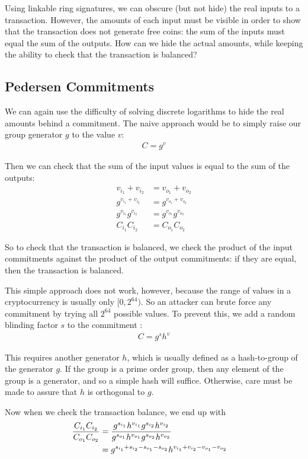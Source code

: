 \documentclass{article}
\begin{document}
Using linkable ring signatures, we can obscure (but not hide) the real inputs to a transaction.  However, the amounts of each input must be visible in order to show that the transaction does not generate free coins: the sum of the inputs must equal the sum of the outputs.  How can we hide the actual amounts, while keeping the ability to check that the transaction is balanced?


\subsection{Pedersen Commitments}

We can again use the difficulty of solving discrete logarithms to hide the real amounts behind a commitment.  The naive approach would be to simply raise our group generator $g$ to the value $v$:
\begin{align}
  C=g^v
\end{align}

Then we can check that the sum of the input values is equal to the sum of the outputs:
\begin{align}
  v_{i_1} + v_{i_2} &= v_{o_1} + v_{o_2}\\
  g^{v_{i_1} + v_{i_2}} &= g^{v_{o_1} + v_{o_2}}\\
  g^{v_{i_1}} g^{v_{i_2}} &= g^{v_{o_1}} g^{v_{o_2}}\\
  C_{i_1} C_{i_2} &= C_{o_1} C_{o_2}
\end{align}
  
So to check that the transaction is balanced, we check the product of the input commitments against the product of the output commitments: if they are equal, then the transaction is balanced.

This simple approach does not work, however, because the range of values in a cryptocurrency is usually only $[0, 2^{64})$.  So an attacker can brute force any commitment by trying all $2^{64}$ possible values.  To prevent this, we add a random blinding factor $s$ to the commitment \cite{ringct}:
\begin{align}
  C = g^s h^v
\end{align}
  
This requires another generator $h$, which is usually defined as a hash-to-group of the generator $g$.  If the group is a prime order group, then any element of the group is a generator, and so a simple hash will suffice.  Otherwise, care must be made to assure that $h$ is orthogonal to $g$.

Now when we check the transaction balance, we end up with
\begin{align}
  \frac{C_{i_1} C_{i_2}}{C_{o_1} C_{o_2}} &= \frac{g^{s_{i_1}} h^{v_{i_1}} g^{s_{i_2}} h^{v_{i_2}}}{g^{s_{o_1}} h^{v_{o_1}} g^{s_{o_2}} h^{v_{o_2}}}
  \cr &= g^{s_{i_1} + s_{i_2} - s_{o_1} - s_{o_2}} h^{v_{i_1} + v_{i_2} - v_{o_1} - v_{o_2}}
\end{align}
\end{document}
